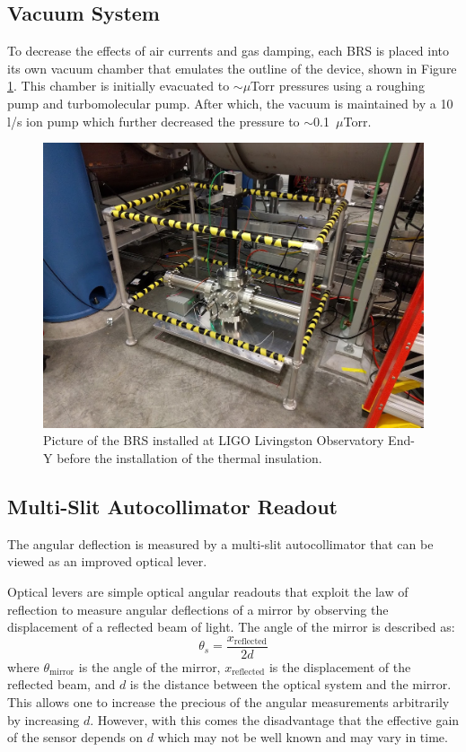 \documentclass [12pt, proquest]{uwthesis}[2019]
\begin{document}
\subsection{Vacuum System}

To decrease the effects of air currents and gas damping, each BRS is placed into its own vacuum chamber that emulates the outline of the device, shown in Figure \ref{BRSPic}. This chamber is initially evacuated to $\sim \mu$Torr pressures using a roughing pump and turbomolecular pump. After which, the vacuum is maintained by a 10 l/s ion pump which further decreased the pressure to $\sim$0.1~$\mu$Torr.

\begin{figure}[!h]
\begin{center}
 \includegraphics[width=\textwidth]{BRSPic.jpg}
\caption[Picture of an installed BRS]{Picture of the BRS installed at LIGO Livingston Observatory End-Y before the installation of the thermal insulation.}
\label{BRSPic}
\end{center}
\end{figure}

\subsection{Multi-Slit Autocollimator Readout}

The angular deflection is measured by a multi-slit autocollimator \cite{MSA} that can be viewed as an improved optical lever.

Optical levers are simple optical angular readouts that exploit the law of reflection to measure angular deflections of a mirror by observing the displacement of a reflected beam of light. The angle of the mirror is described as:
\begin{equation}
\theta_{s}=\frac{x_{\text{reflected}}}{2d}
\end{equation}
where $\theta_\text{mirror}$ is the angle of the mirror, $x_\text{reflected}$ is the displacement of the reflected beam, and $d$ is the distance between the optical system and the mirror. This allows one to increase the precious of the angular measurements arbitrarily by increasing $d$. However, with this comes the disadvantage that the effective gain of the sensor depends on $d$ which may not be well known and may vary in time.
\end{document}
